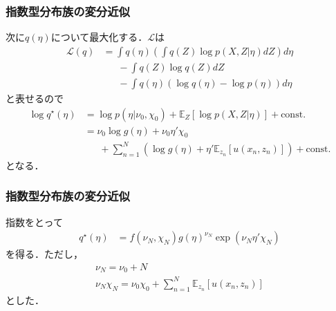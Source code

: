 \documentclass[10pt,hyperref={unicode}]{beamer}
\newcommand{\parentheses}[1]{\left(#1\right)}
\newcommand{\brackets}[1]{\left[#1\right]}
\newcommand{\const}{\mathrm{const.}}
\newcommand{\energy}{\mathcal{L}}
\begin{document}
\begin{frame}
\frametitle{指数型分布族の変分近似}
次に$q\parentheses{\eta}$について最大化する．$\energy$は
\begin{align*}
    \energy\parentheses{q}
    &= \int q\parentheses{\eta} \parentheses{%
            \int q\parentheses{Z} \log p \parentheses{X,Z|\eta}dZ
        }d\eta \\
    &\phantom{=}\ -\int q\parentheses{Z} \log q \parentheses{Z} dZ \\
    &\phantom{=}\ -\int q\parentheses{\eta} \parentheses{\log q \parentheses{\eta} - \log p \parentheses{\eta}}d\eta
\end{align*}
と表せるので
\begin{align*}
    \log q^\star\parentheses{\eta}
    &= \log p\parentheses{\eta | \nu_0,\chi_0} + \mathbb{E}_{Z}\brackets{\log p \parentheses{X, Z | \eta}} + \const \tag{10.117} \\
    &= \nu_0 \log g \parentheses{\eta} + \nu_0 \eta' \chi_0 \\
    &\phantom{=}\ + \sum_{n = 1}^N \parentheses{\log g \parentheses{\eta} + \eta' \mathbb{E}_{z_n}\brackets{u\parentheses{x_n, z_n}}} + \const \tag{10.118}
\end{align*}
となる．
\end{frame}

\begin{frame}
\frametitle{指数型分布族の変分近似}
指数をとって
\begin{align}
    q^\star\parentheses{\eta}
    &= f\parentheses{\nu_N,\chi_N}g\parentheses{\eta}^{\nu_N}\exp\parentheses{\nu_N \eta' \chi_N} \tag{10.119}
\end{align}
を得る．ただし，
\begin{gather}
    \nu_N = \nu_0 + N \tag{10.120} \\
    \nu_N\chi_N = \nu_0 \chi_0 + \sum_{n = 1}^N \mathbb{E}_{z_n}\brackets{u\parentheses{x_n, z_n}} \tag{10.121}
\end{gather}
とした．
\end{frame}
\end{document}
